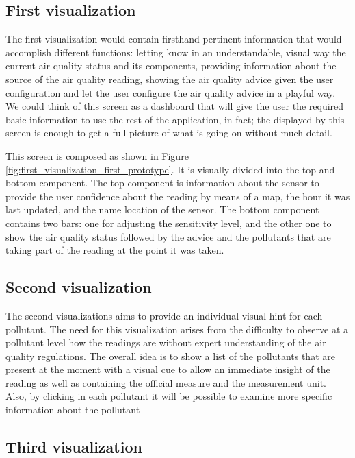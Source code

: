 \subsection{First visualization}

The first visualization would contain firsthand pertinent information that would accomplish different functions: letting know in an understandable, visual way the current air quality status and its components, providing information about the source of the air quality reading, showing the air quality advice given the user configuration and let the user configure the air quality advice in a playful way. We could think of this screen as a dashboard that will give the user the required basic information to use the rest of the application, in fact; the displayed by this screen is enough to get a full picture of what is going on without much detail.

This screen is composed as shown in Figure \ref{fig:first_visualization_first_prototype}. It is visually divided into the top and bottom component. The top component is information about the sensor to provide the user confidence about the reading by means of a map, the hour it was last updated, and the name location of the sensor. The bottom component contains two bars: one for adjusting the sensitivity level, and the other one to show the air quality status followed by the advice and the pollutants that are taking part of the reading at the point it was taken. 

\subsection{Second visualization}

The second visualizations aims to provide an individual visual hint for each pollutant. The need for this visualization arises from the difficulty to observe at a pollutant level how the readings are without expert understanding of the air quality regulations. The overall idea is to show a list of the pollutants that are present at the moment with a visual cue to allow an immediate insight of the reading as well as containing the official measure and the measurement unit. Also, by clicking in each pollutant it will be possible to examine more specific information about the pollutant  

\subsection{Third visualization}

